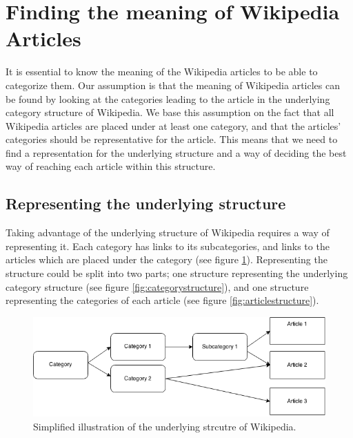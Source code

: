 
\section{Finding the meaning of Wikipedia Articles}
It is essential to know the meaning of the Wikipedia articles to be able to categorize them. 
Our assumption is that the meaning of Wikipedia articles can be found by looking at the categories leading to the article in the underlying category structure of Wikipedia. We base this assumption on the fact that all Wikipedia articles are placed under at least one category, and that the articles' categories should be representative for the article. This means that we need to find a representation for the underlying structure and a way of deciding the best way of reaching each article within this structure.


\subsection{Representing the underlying structure}
Taking advantage of the underlying structure of Wikipedia requires a way of representing it. Each category has links to its subcategories, and links to the articles which are placed under the category (see figure \ref{fig:graphstructure}). Representing the structure could be split into two parts; one structure representing the underlying category structure (see figure \ref{fig:categorystructure}), and one structure representing the categories of each article (see figure \ref{fig:articlestructure}).  %

\begin{figure}
\centering
\includegraphics[width=\textwidth]{Chapters/Methods/graphstructure}
\caption{Simplified illustration of the underlying strcutre of Wikipedia.}
\label{fig:graphstructure}
\end{figure}

